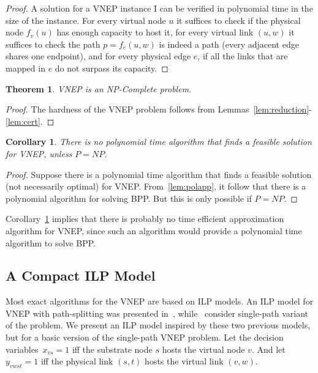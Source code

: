 \documentclass[conference]{IEEEtran}
\newtheorem{corollary}{Corollary}
\newtheorem{theorem}{Theorem}[section]
\begin{document}
\begin{proof}
  A solution for a VNEP instance I can be verified in polynomial time in the size of the instance. For every virtual node $u$ it suffices to check if the physical node $f_v(u)$ has enough capacity to host it, for every virtual link $(u,w)$ it suffices to check the path $p = f_e(u,w)$ is indeed a path (every adjacent edge shares one endpoint), and for every physical edge $e$, if all the links that are mapped in $e$ do not surpass its capacity.
\end{proof}

\begin{theorem} \label{th:npcomplete}
  VNEP is an NP-Complete problem.
\end{theorem}

\begin{proof}
The hardness of the VNEP problem follows from Lemmas~\ref{lem:reduction}-\ref{lem:cert}. 
\end{proof}

\begin{corollary} \label{co:nopoly}
  There is no polynomial time algorithm that finds a feasible solution for VNEP, unless $P=NP$.
\end{corollary}

\begin{proof}
  Suppose there is a polynomial time algorithm that finds a feasible solution (not necessarily optimal) for VNEP. From~\ref{lem:polapp}, it follow that there is a polynomial algorithm for solving BPP\@. 
  But this is only possible if $P = NP$.
\end{proof}

Corollary~\ref{co:nopoly} implies that there is probably no time efficient approximation algorithm for VNEP, since such an algorithm would provide a polynomial time algorithm to solve BPP.

\subsection{A Compact ILP Model}
\label{sec:ILPmodel}
Most exact algorithms for the VNEP are based on ILP models. 
An ILP model for VNEP with path-splitting was presented in~\cite{Chowdhury2009}, 
while~\cite{Alkmim:2011} consider single-path variant of the problem.
We present an ILP model inspired by these two previous models, but for a basic version of the single-path VNEP problem.
Let the decision variables~$x_{vs} = 1$ iff the substrate node $s$ hosts the virtual node $v$. And let $y_{vwst} = 1$ iff the physical link $(s,t)$ hosts the virtual link $(v,w)$.
\end{document}
